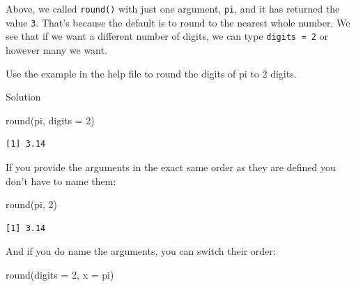\documentclass[
  letterpaper,
  DIV=11,
  numbers=noendperiod,
  oneside]{scrreprt}
\newenvironment{Shaded}{\begin{snugshade}}{\end{snugshade}}
\newcommand{\AttributeTok}[1]{\textcolor[rgb]{0.40,0.45,0.13}{#1}}
\newcommand{\DecValTok}[1]{\textcolor[rgb]{0.68,0.00,0.00}{#1}}
\newcommand{\FunctionTok}[1]{\textcolor[rgb]{0.28,0.35,0.67}{#1}}
\newcommand{\NormalTok}[1]{\textcolor[rgb]{0.00,0.23,0.31}{#1}}
\begin{document}
Above, we called \texttt{round()} with just one argument, \texttt{pi},
and it has returned the value \texttt{3}. That's because the default is
to round to the nearest whole number. We see that if we want a different
number of digits, we can type \texttt{digits\ =\ 2} or however many we
want.

\begin{tcolorbox}[enhanced jigsaw, bottomrule=.15mm, colback=white, colframe=quarto-callout-tip-color-frame, toprule=.15mm, coltitle=black, rightrule=.15mm, opacitybacktitle=0.6, colbacktitle=quarto-callout-tip-color!10!white, toptitle=1mm, leftrule=.75mm, breakable, bottomtitle=1mm, titlerule=0mm, title={👉 Your Turn}, arc=.35mm, left=2mm, opacityback=0]

Use the example in the help file to round the digits of pi to 2 digits.

Solution

\begin{Shaded}
\begin{Highlighting}[]
\FunctionTok{round}\NormalTok{(pi, }\AttributeTok{digits =} \DecValTok{2}\NormalTok{)}
\end{Highlighting}
\end{Shaded}

\begin{verbatim}
[1] 3.14
\end{verbatim}

\end{tcolorbox}

If you provide the arguments in the exact same order as they are defined
you don't have to name them:

\begin{Shaded}
\begin{Highlighting}[]
\FunctionTok{round}\NormalTok{(pi, }\DecValTok{2}\NormalTok{)}
\end{Highlighting}
\end{Shaded}

\begin{verbatim}
[1] 3.14
\end{verbatim}

And if you do name the arguments, you can switch their order:

\begin{Shaded}
\begin{Highlighting}[]
\FunctionTok{round}\NormalTok{(}\AttributeTok{digits =} \DecValTok{2}\NormalTok{, }\AttributeTok{x =}\NormalTok{ pi)}
\end{Highlighting}
\end{Shaded}
\end{document}
